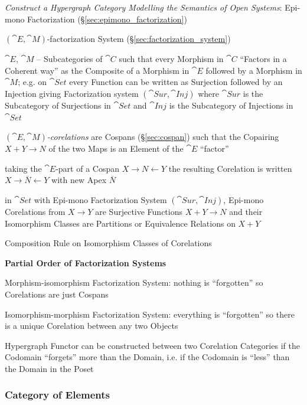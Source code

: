 \emph{Construct a Hypergraph Category Modelling the Semantics of Open
  Systems}: Epi-mono Factorization (\S\ref{sec:epimono_factorization})


$(\cat{E},\cat{M})$-factorization System
(\S\ref{sec:factorization_system})

$\cat{E}$, $\cat{M}$ -- Subcategories of $\cat{C}$ such that every
Morphism in $\cat{C}$ ``Factors in a Coherent way'' as the Composite
of a Morphism in $\cat{E}$ followed by a Morphism in $\cat{M}$; e.g.
on $\cat{Set}$ every Function can be written as Surjection followed by
an Injection giving Factorization system $(\cat{Sur},\cat{Inj})$ where
$\cat{Sur}$ is the Subcategory of Surjections in $\cat{Set}$ and
$\cat{Inj}$ is the Subcategory of Injections in $\cat{Set}$

\emph{$(\cat{E},\cat{M})$-corelations} are Cospans
(\S\ref{sec:cospan}) such that the Copairing $X + Y \rightarrow N$ of
the two Maps is an Element of the $\cat{E}$ ``factor''

taking the $\cat{E}$-part of a Cospan $X \rightarrow N \leftarrow Y$
the resulting Corelation is written $X \rightarrow \overline{N}
\leftarrow Y$ with new Apex $\overline{N}$

in $\cat{Set}$ with Epi-mono Factorization System $(\cat{Sur},
\cat{Inj})$, Epi-mono Corelations from $X \rightarrow Y$ are
Surjective Functions $X + Y \rightarrow N$ and their Isomorphism
Classes are Partitions or Equivalence Relations on $X + Y$

Composition Rule on Isomorphism Classes of Corelations %


\textbf{Partial Order of Factorization Systems} %

Morphism-isomorphism Factorization System: nothing is ``forgotten'' so
Corelations are just Cospans

Isomorphism-morphism Factorization System: everything is ``forgotten''
so there is a unique Corelation between any two Objects

Hypergraph Functor can be constructed between two Corelation
Categories if the Codomain ``forgets'' more than the Domain, i.e. if
the Codomain is ``less'' than the Domain in the Poset



\subsubsection{Category of Elements}\label{sec:element_category}

